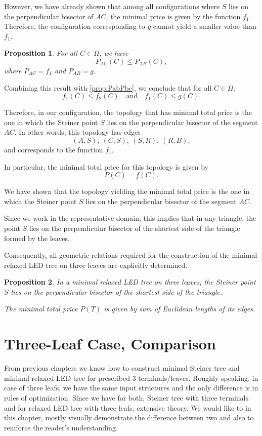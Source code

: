 \documentclass[openany]{book}
\newcommand{\Ptotal}[1]{P(#1)}
\newtheorem{proposition}{Proposition}
\begin{document}
	However, we have already shown that among all configurations where \(S\) lies
	on the perpendicular bisector of \(AC\), the minimal price is given by the
	function \(f_1\). Therefore, the configuration corresponding to \(g\) cannot
	yield a smaller value than \(f_1\).
	\begin{proposition}
		For all \(C \in \Omega\), we have
		\[
		P_{AC}(C) \le P_{AB}(C),
		\]
		where \(P_{AC} = f_1\) and \(P_{AB} = g\).
	\end{proposition}

	Combining this result with \cref{prop:PabPbc}, we conclude that for all
	\(C \in \Omega\),
	\[
	f_1(C) \le f_2(C)
	\quad \text{and} \quad
	f_1(C) \le g(C).
	\]
	
	Therefore, in our configuration, the topology that has minimal total price
	is the one in which the Steiner point \(S\) lies on the perpendicular bisector
	of the segment \(AC\). In other words, this topology has edges
	\[
	(A,S),\ (C,S),\ (S,R),\ (R,B),
	\]
	and corresponds to the function \(f_1\).
	
	In particular, the minimal total price for this topology is given by
	\[
	\Ptotal{C} = f(C).
	\]
	
	We have shown that the topology yielding the minimal total price is the one
	in which the Steiner point \(S\) lies on the perpendicular bisector of the
	segment \(AC\).
	
	Since we work in the representative domain, this implies that in any triangle,
	the point \(S\) lies on the perpendicular bisector of the shortest side of the
	triangle formed by the leaves.
	
	Consequently, all geometric relations required for the construction of the
	minimal relaxed LED tree on three leaves are explicitly determined.
	
	\begin{proposition}\label{grandfinal}
		In a minimal relaxed LED tree on three leaves, the Steiner point \(S\) lies
		on the perpendicular bisector of the shortest side of the triangle.
		
		The minimal total price \(\Ptotal{T} \) is given by sum of Euclidean lengths of its edges.
		
	\end{proposition}
	
	\chapter{Three-Leaf Case, Comparison}
	From previous chapters we know how to construct minimal Steiner tree and minimal relaxed LED tree for prescribed 3 terminals/leaves. Roughly speaking, in case of three leafs, we have the same input structures and the only difference is in rules of optimization. Since we have for both, Steiner tree with three terminals and for relaxed LED tree with three leafs, extensive theory. We would like to in this chapter, mostly visually demonstrate the difference between two and also to reinforce the reader’s understanding.  
	
\end{document}
